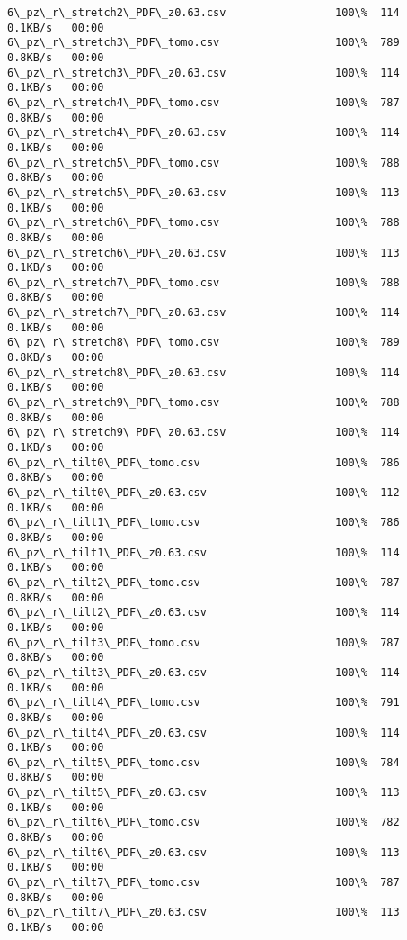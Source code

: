 \documentclass[11pt]{article}
\begin{document}
\begin{Verbatim}[commandchars=\\\{\}]
6\_pz\_r\_stretch2\_PDF\_z0.63.csv                 100\%  114     0.1KB/s   00:00    
6\_pz\_r\_stretch3\_PDF\_tomo.csv                  100\%  789     0.8KB/s   00:00    
6\_pz\_r\_stretch3\_PDF\_z0.63.csv                 100\%  114     0.1KB/s   00:00    
6\_pz\_r\_stretch4\_PDF\_tomo.csv                  100\%  787     0.8KB/s   00:00    
6\_pz\_r\_stretch4\_PDF\_z0.63.csv                 100\%  114     0.1KB/s   00:00    
6\_pz\_r\_stretch5\_PDF\_tomo.csv                  100\%  788     0.8KB/s   00:00    
6\_pz\_r\_stretch5\_PDF\_z0.63.csv                 100\%  113     0.1KB/s   00:00    
6\_pz\_r\_stretch6\_PDF\_tomo.csv                  100\%  788     0.8KB/s   00:00    
6\_pz\_r\_stretch6\_PDF\_z0.63.csv                 100\%  113     0.1KB/s   00:00    
6\_pz\_r\_stretch7\_PDF\_tomo.csv                  100\%  788     0.8KB/s   00:00    
6\_pz\_r\_stretch7\_PDF\_z0.63.csv                 100\%  114     0.1KB/s   00:00    
6\_pz\_r\_stretch8\_PDF\_tomo.csv                  100\%  789     0.8KB/s   00:00    
6\_pz\_r\_stretch8\_PDF\_z0.63.csv                 100\%  114     0.1KB/s   00:00    
6\_pz\_r\_stretch9\_PDF\_tomo.csv                  100\%  788     0.8KB/s   00:00    
6\_pz\_r\_stretch9\_PDF\_z0.63.csv                 100\%  114     0.1KB/s   00:00    
6\_pz\_r\_tilt0\_PDF\_tomo.csv                     100\%  786     0.8KB/s   00:00    
6\_pz\_r\_tilt0\_PDF\_z0.63.csv                    100\%  112     0.1KB/s   00:00    
6\_pz\_r\_tilt1\_PDF\_tomo.csv                     100\%  786     0.8KB/s   00:00    
6\_pz\_r\_tilt1\_PDF\_z0.63.csv                    100\%  114     0.1KB/s   00:00    
6\_pz\_r\_tilt2\_PDF\_tomo.csv                     100\%  787     0.8KB/s   00:00    
6\_pz\_r\_tilt2\_PDF\_z0.63.csv                    100\%  114     0.1KB/s   00:00    
6\_pz\_r\_tilt3\_PDF\_tomo.csv                     100\%  787     0.8KB/s   00:00    
6\_pz\_r\_tilt3\_PDF\_z0.63.csv                    100\%  114     0.1KB/s   00:00    
6\_pz\_r\_tilt4\_PDF\_tomo.csv                     100\%  791     0.8KB/s   00:00    
6\_pz\_r\_tilt4\_PDF\_z0.63.csv                    100\%  114     0.1KB/s   00:00    
6\_pz\_r\_tilt5\_PDF\_tomo.csv                     100\%  784     0.8KB/s   00:00    
6\_pz\_r\_tilt5\_PDF\_z0.63.csv                    100\%  113     0.1KB/s   00:00    
6\_pz\_r\_tilt6\_PDF\_tomo.csv                     100\%  782     0.8KB/s   00:00    
6\_pz\_r\_tilt6\_PDF\_z0.63.csv                    100\%  113     0.1KB/s   00:00    
6\_pz\_r\_tilt7\_PDF\_tomo.csv                     100\%  787     0.8KB/s   00:00    
6\_pz\_r\_tilt7\_PDF\_z0.63.csv                    100\%  113     0.1KB/s   00:00    

\end{Verbatim}
\end{document}
